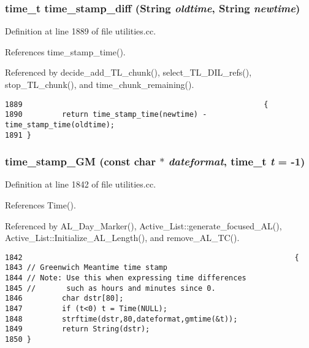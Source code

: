 \subsubsection{\setlength{\rightskip}{0pt plus 5cm}time\_\-t time\_\-stamp\_\-diff ({\bf String} {\em oldtime}, {\bf String} {\em newtime})}\label{utilities_8cc_a26}




Definition at line 1889 of file utilities.cc.

References time\_\-stamp\_\-time().

Referenced by decide\_\-add\_\-TL\_\-chunk(), select\_\-TL\_\-DIL\_\-refs(), stop\_\-TL\_\-chunk(), and time\_\-chunk\_\-remaining().



\footnotesize\begin{verbatim}1889                                                       {
1890         return time_stamp_time(newtime) - time_stamp_time(oldtime);
1891 }
\end{verbatim}\normalsize 
{}
\subsubsection{ time\_\-stamp\_\-GM (const char $\ast$ {\em dateformat}, time\_\-t {\em t} = -1)}\label{utilities_8cc_a21}




Definition at line 1842 of file utilities.cc.

References Time().

Referenced by AL\_\-Day\_\-Marker(), Active\_\-List::generate\_\-focused\_\-AL(), Active\_\-List::Initialize\_\-AL\_\-Length(), and remove\_\-AL\_\-TC().



\footnotesize\begin{verbatim}1842                                                              {
1843 // Greenwich Meantime time stamp
1844 // Note: Use this when expressing time differences
1845 //       such as hours and minutes since 0.
1846         char dstr[80];
1847         if (t<0) t = Time(NULL);
1848         strftime(dstr,80,dateformat,gmtime(&t));
1849         return String(dstr);
1850 }
\end{verbatim}\normalsize 
{}
